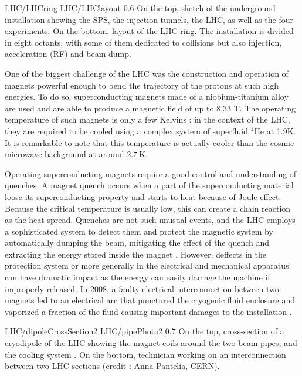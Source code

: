                      {LHC/LHCring}
                     {LHC/LHClayout}
                     {0.6}
                     {On the top, sketch of the underground installation showing the SPS,
                     the injection tunnels, the LHC, as well as the four experiments. On
                     the bottom, layout of the LHC ring. The installation is divided in
                     eight octants, with some of them dedicated to collisions but also
                     injection, acceleration (RF) and beam dump.}

    One of the biggest challenge of the LHC was the construction and operation of magnets
    powerful enough to bend the trajectory of the protons at such high energies. To do
    so, superconducting magnets made of a niobium-titanium alloy are used and are able to
    produce a magnetic field of up to $8.33$ T. The operating temperature of such magnets
    is only a few Kelvins : in the context of the LHC, they are required to be cooled using
    a complex system of superfluid $^4$He at 1.9K. It is remarkable to note that this
    temperature is actually cooler than the cosmic microwave background at around $2.7~\text{K}$.

    Operating superconducting magnets require a good control and understanding of quenches.
    A magnet quench occurs when a part of the superconducting material loose its superconducting
    property and starts to heat because of Joule effect. Because the critical temperature
    is usually low, this can create a chain reaction as the heat spread. Quenches are
    not such unusual events, and the LHC employs a sophisticated system to detect them and protect
    the magnetic system by automatically dumping the beam, mitigating the effect of the
    quench and extracting the energy stored inside the magnet \cite{LHCmagnets}.
    However, deffects in the protection
    system or more generally in the electrical and mechanical apparatus can have dramatic
    impact as the energy can easily damage the machine if improperly released. In 2008,
    a faulty electrical interconnection between two magnets led to an electrical arc that
    punctured the cryogenic fluid enclosure and vaporized a fraction of the fluid causing
    important damages to the installation \cite{LHCindicent}.

                     {LHC/dipoleCrossSection2}
                     {LHC/pipePhoto2}
                     {0.7}
                     {On the top, cross-section of a cryodipole of the LHC
                     showing the magnet coils around the two beam pipes, and the cooling system \cite{LHC}.
                     On the bottom, technician working on an interconnection between two LHC
                     sections (credit : Anna Pantelia, CERN).}

